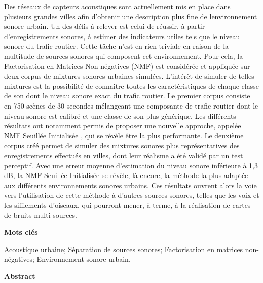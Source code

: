 \begin{cover}
\begin{multicols}{2}
	{\small \begin{spacing}{1.0} Des réseaux de capteurs acoustiques sont actuellement mis en place dans plusieurs grandes villes afin d'obtenir une description plus fine de lenvironnement sonore urbain. Un des défis à relever est celui de réussir, à partir d'enregistrements sonores, à estimer des indicateurs utiles tels que le niveau sonore du trafic routier. Cette tâche n'est en rien triviale en raison de la multitude de sources sonores qui composent cet environnement. Pour cela, la Factorisation en Matrices Non-négatives (NMF) est considérée et appliquée sur deux corpus de mixtures sonores urbaines simulées. L'intérêt de simuler de telles mixtures est la possibilité de connaitre toutes les caractéristiques de chaque classe de son dont le niveau sonore exact du trafic routier. 
Le premier corpus consiste en 750 scènes de 30 secondes mélangeant une composante de trafic routier dont le niveau sonore est calibré et une classe de son plus générique. Les différents résultats ont notamment permis de proposer une nouvelle approche, appelée \og NMF Seuillée Initialisée \fg{}, qui se révèle être la plus performante. Le deuxième corpus créé  permet de simuler des mixtures sonores plus représentatives des enregistrements effectués en villes, dont leur réalisme a été validé par un test perceptif. Avec une erreur moyenne d'estimation du niveau sonore inférieure à 1,3 dB, la NMF Seuillée Initialisée se révèle, là encore, la méthode la plus adaptée aux différents environnements sonores urbains.  
Ces résultats ouvrent alors la voie vers l'utilisation de cette méthode à d'autres sources sonores, telles que les voix et les sifflements d'oiseaux, qui pourront mener, à terme, à la réalisation de cartes de bruits multi-sources.
\end{spacing}}
    
    
    \noindent 
	\bigskip
	
    \noindent
    \textbf{Mots clés}
    \smallskip

\begin{spacing}{1.2}
\noindent
Acoustique urbaine; Séparation de sources sonores; Factorisation en matrices non-négatives; Environnement sonore urbain.\end{spacing}
    \columnbreak

    \noindent\textbf{\large Abstract}
    \medskip
	

\end{multicols}
\end{cover}
